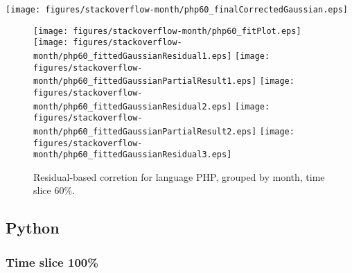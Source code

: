 \begin{center}
{\texttt{[image: figures/stackoverflow-month/php60\_finalCorrectedGaussian.eps]}}
\end{center}

\FloatBarrier

\begin{figure}[t]
\centering
{}
{\texttt{[image: figures/stackoverflow-month/php60\_fitPlot.eps]}}
{\texttt{[image: figures/stackoverflow-month/php60\_fittedGaussianResidual1.eps]}}
{\texttt{[image: figures/stackoverflow-month/php60\_fittedGaussianPartialResult1.eps]}}
{\texttt{[image: figures/stackoverflow-month/php60\_fittedGaussianResidual2.eps]}}
{\texttt{[image: figures/stackoverflow-month/php60\_fittedGaussianPartialResult2.eps]}}
{\texttt{[image: figures/stackoverflow-month/php60\_fittedGaussianResidual3.eps]}}
\caption{Residual-based corretion for language PHP, grouped by month, time slice 60\%.}
\end{figure}


\FloatBarrier


\subsection{Python}

\subsubsection{Time slice 100\%}

